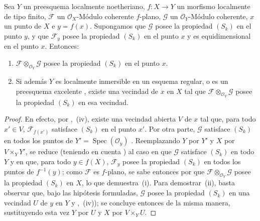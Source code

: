 \begin{corollary}[12.1.5]
\label{IV.12.1.5}
Sea $Y$ un preesquema localmente noetheriano, $f:X\to Y$ un morfismo localmente de tipo finito, $\mathcal F$ un $\mathcal O_X$-Módulo coherente $f$-plano, $\mathcal G$ un $\mathcal O_Y$-Módulo coherente, $x$ un punto de $X$ e $y=f(x)$.
Supongamos que $\mathcal G$ posee la propiedad $(S_k)$ en el punto $y$, y que $\mathcal F_y$ posee la propiedad $(S_k)$ en el punto $x$ y es equidimensional en el punto $x$.
Entonces:
\begin{enumerate}[label=\textup{(\roman*)}]
  \item $\mathcal F\otimes_{\mathcal O_Y}\mathcal G$ posee la propiedad $(S_k)$ en el punto $x$.
  \item Si además $Y$ es localmente inmersible en un esquema regular, o es un preesquema excelente , existe una vecindad de $x$ en $X$ tal que $\mathcal F\otimes_{\mathcal O_Y}\mathcal G$ posee la propiedad $(S_k)$ en esa vecindad.
\end{enumerate}
\end{corollary}

\begin{proof}
En efecto, por ,~(iv), existe una vecindad abierta $V$ de $x$ tal que, para todo $x'\in V$, $\mathcal F_{f(x')}$ satisface $(S_k)$ en el punto $x'$.
Por otra parte, $\mathcal G$ satisface $(S_k)$ en todos los puntos de $Y'=\operatorname{Spec}(\mathcal O_y)$ .
Reemplazando $Y$ por $Y'$ y $X$ por $V\times_YY'$, se reduce (teniendo en cuenta ) al caso en que $\mathcal G$ satisface $(S_k)$ en todo $Y$ y en que, para todo $y\in f(X)$, $\mathcal F_y$ posee la propiedad $(S_k)$ en todos los puntos de $f^{-1}(y)$; como $\mathcal F$ es $f$-plano, se sabe entonces por  que $\mathcal F\otimes_{\mathcal O_Y}\mathcal G$ posee la propiedad $(S_k)$ en $X$, lo que demuestra~(i).
Para demostrar~(ii), basta observar que, bajo las hipótesis formuladas, $\mathcal G$ posee la
propiedad $(S_k)$ en una vecindad $U$ de $y$ en $Y$  y ,~(iv)); se concluye entonces de la misma manera, sustituyendo esta vez $Y$ por $U$ y $X$ por $V\times_YU$.
\end{proof}

